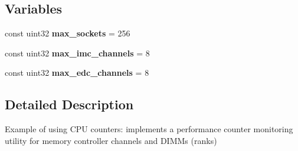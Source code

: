 \subsection*{Variables}
\begin{DoxyCompactItemize}
\item 
\mbox{\label{pcm-memory_8cpp_a7ef99323bd02eadd1f92faf654a892be}} 
const uint32 {\bfseries max\+\_\+sockets} = 256
\item 
\mbox{\label{pcm-memory_8cpp_a2722bd2db68b8fa831786ce704a82bbb}} 
const uint32 {\bfseries max\+\_\+imc\+\_\+channels} = 8
\item 
\mbox{\label{pcm-memory_8cpp_af68e3f949d58c90477796d2e9e12cfcc}} 
const uint32 {\bfseries max\+\_\+edc\+\_\+channels} = 8
\end{DoxyCompactItemize}


\subsection{Detailed Description}
Example of using C\+PU counters\+: implements a performance counter monitoring utility for memory controller channels and D\+I\+M\+Ms (ranks) 

